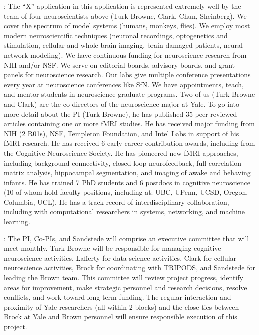 : The ``X'' application in this application is
represented extremely well by the team of four neuroscientists above
(Turk-Browne, Clark, Chun, Sheinberg). We cover the spectrum of model
systems (humans, monkeys, flies). We employ most modern
neuroscientific techniques (neuronal recordings, optogenetics and
stimulation, cellular and whole-brain imaging, brain-damaged patients,
neural network modeling). We have continuous funding for neuroscience
research from NIH and/or NSF. We serve on editorial boards, advisory
boards, and grant panels for neuroscience research. Our labs give
multiple conference presentations every year at neuroscience
conferences like SfN. We have appointments, teach, and mentor students
in neuroscience graduate programs. Two of us (Turk-Browne and Clark)
are the co-directors of the neuroscience major at Yale. To go into
more detail about the PI (Turk-Browne), he has published 35
peer-reviewed articles containing one or more fMRI studies. He has
received major funding from NIH (2 R01s), NSF, Templeton Foundation,
and Intel Labs in support of his fMRI research. He has received 6
early career contribution awards, including from the Cognitive
Neuroscience Society. He has pioneered new fMRI approaches, including
background connectivity, closed-loop neurofeedback, full correlation
matrix analysis, hippocampal segmentation, and imaging of awake and
behaving infants. He has trained 7 PhD students and 6 postdocs in
cognitive neuroscience (10 of whom hold faculty positions, including
at: UBC, UPenn, UCSD, Oregon, Columbia, UCL). He has a track record of
interdisciplinary collaboration, including with computational
researchers in systems, networking, and machine learning. 

: The PI, Co-PIs, and Sandstede will
comprise an executive committee that will meet monthly. Turk-Browne
will be responsible for managing cognitive neuroscience activities,
Lafferty for data science activities, Clark for cellular neuroscience
activities, Brock for coordinating with TRIPODS, and Sandstede for
leading the Brown team. This committee will review project progress,
identify areas for improvement, make strategic personnel and research
decisions, resolve conflicts, and work toward long-term funding. The
regular interaction and proximity of Yale researchers (all within 2
blocks) and the close ties between Brock at Yale and Brown personnel
will ensure responsible execution of this project.

